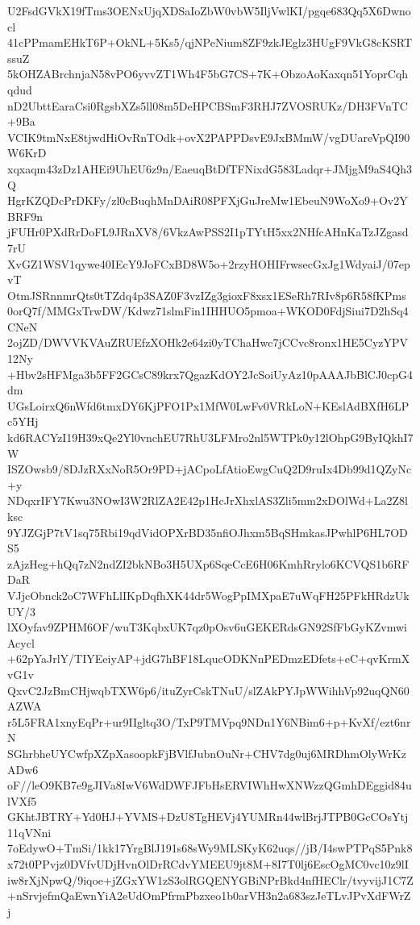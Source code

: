 U2FsdGVkX19fTms3OENxUjqXDSaIoZbW0vbW5IljVwlKI/pgqe683Qq5X6Dwnocl
41cPPmamEHkT6P+OkNL+5Ks5/qjNPeNium8ZF9zkJEglz3HUgF9VkG8cKSRTssuZ
5kOHZABrchnjaN58vPO6yvvZT1Wh4F5bG7CS+7K+ObzoAoKaxqn51YoprCqhqdud
nD2UbttEaraCsi0RgsbXZs5ll08m5DeHPCBSmF3RHJ7ZVOSRUKz/DH3FVnTC+9Ba
VCIK9tmNxE8tjwdHiOvRnTOdk+ovX2PAPPDsvE9JxBMmW/vgDUareVpQI90W6KrD
xqxaqm43zDz1AHEi9UhEU6z9n/EaeuqBtDfTFNixdG583Ladqr+JMjgM9aS4Qh3Q
HgrKZQDcPrDKFy/zl0cBuqhMnDAiR08PFXjGuJreMw1EbeuN9WoXo9+Ov2YBRF9n
jFUHr0PXdRrDoFL9JRnXV8/6VkzAwPSS2I1pTYtH5xx2NHfcAHnKaTzJZgasd7rU
XvGZ1WSV1qywe40IEcY9JoFCxBD8W5o+2rzyHOHIFrwsecGxJg1WdyaiJ/07epvT
OtmJSRnnmrQts0tTZdq4p3SAZ0F3vzIZg3gioxF8xsx1ESeRh7RIv8p6R58fKPms
0orQ7f/MMGxTrwDW/Kdwz71slmFin1IHHUO5pmoa+WKOD0FdjSiui7D2hSq4CNeN
2ojZD/DWVVKVAuZRUEfzXOHk2e64zi0yTChaHwc7jCCvc8ronx1HE5CyzYPV12Ny
+Hbv2sHFMga3b5FF2GCsC89krx7QgazKdOY2JcSoiUyAz10pAAAJbBlCJ0cpG4dm
UGsLoirxQ6nWfd6tmxDY6KjPFO1Px1MfW0LwFv0VRkLoN+KEslAdBXfH6LPc5YHj
kd6RACYzI19H39xQe2Yl0vnchEU7RhU3LFMro2nl5WTPk0y12lOhpG9ByIQkhI7W
ISZOwsb9/8DJzRXxNoR5Or9PD+jACpoLfAtioEwgCuQ2D9ruIx4Db99d1QZyNc+y
NDqxrIFY7Kwu3NOwI3W2RlZA2E42p1HcJrXhxlAS3Zli5mm2xDOlWd+La2Z8lksc
9YJZGjP7tV1sq75Rbi19qdVidOPXrBD35nfiOJhxm5BqSHmkasJPwhlP6HL7ODS5
zAjzHeg+hQq7zN2ndZI2bkNBo3H5UXp6SqeCcE6H06KmhRrylo6KCVQS1b6RFDaR
VJjcObnck2oC7WFhLlIKpDqfhXK44dr5WogPpIMXpaE7uWqFH25PFkHRdzUkUY/3
lXOyfav9ZPHM6OF/wuT3KqbxUK7qz0pOsv6uGEKERdsGN92SfFbGyKZvmwiAcycl
+62pYaJrlY/TIYEeiyAP+jdG7hBF18LqucODKNnPEDmzEDfets+eC+qvKrmXvG1v
QxvC2JzBmCHjwqbTXW6p6/ituZyrCskTNuU/slZAkPYJpWWihhVp92uqQN60AZWA
r5L5FRA1xnyEqPr+ur9IIgltq3O/TxP9TMVpq9NDn1Y6NBim6+p+KvXf/ezt6nrN
SGhrbheUYCwfpXZpXasoopkFjBVlfJubnOuNr+CHV7dg0uj6MRDhmOlyWrKzADw6
oF//leO9KB7e9gJIVa8IwV6WdDWFJFbHsERVIWhHwXNWzzQGmhDEggid84ulVXf5
GKhtJBTRY+Yd0HJ+YVMS+DzU8TgHEVj4YUMRn44wlBrjJTPB0GcCOsYtj11qVNni
7oEdywO+TmSi/1kk17YrgBlJ191s68sWy9MLSKyK62uqs//jB/I4swPTPqS5Pnk8
x72t0PPvjz0DVfvUDjHvnOlDrRCdvYMEEU9jt8M+8I7T0lj6EscOgMC0vc10z9lI
iw8rXjNpwQ/9iqoe+jZGxYW1zS3olRGQENYGBiNPrBkd4nfHEClr/tvyvijJ1C7Z
+nSrvjefmQaEwnYiA2eUdOmPfrmPbzxeo1b0arVH3n2a683szJeTLvJPvXdFWrZj
